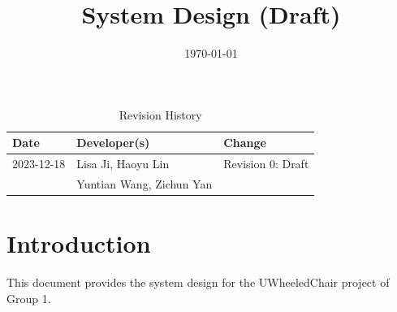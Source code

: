\documentclass[12pt]{article}
\title{System Design (Draft)\\\progname}
\author{\authname}
\date{\today}
\begin{document}
\maketitle
{}

\newpage
\begin{table}[hp]
    \caption{Revision History} \label{TblRevisionHistory}
    \begin{tabularx}{\textwidth}{llX}
        \toprule
        \textbf{Date} & \textbf{Developer(s)}    & \textbf{Change} \\
        \midrule
        2023-12-18    & Lisa Ji, Haoyu Lin       & Revision 0: Draft      \\
                      & Yuntian Wang, Zichun Yan &                 \\
        \bottomrule
    \end{tabularx}
\end{table}

\newpage
\tableofcontents
\newpage
\listoftables
\listoffigures

\newpage
\section{Introduction}
This document provides the system design for the UWheeledChair project of Group 1.
\end{document}
